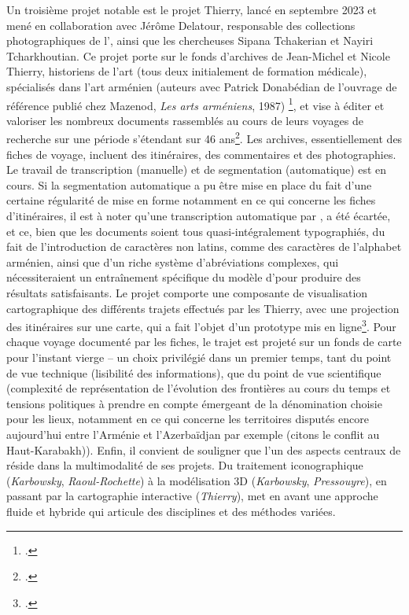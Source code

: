 Un troisième projet notable est le projet Thierry, lancé en septembre 2023 et mené en collaboration avec Jérôme Delatour, responsable des collections photographiques de l'\inha, ainsi que les chercheuses Sipana Tchakerian et Nayiri Tcharkhoutian. Ce projet porte sur le fonds d'archives de Jean-Michel et Nicole Thierry, historiens de l'art (tous deux initialement de formation médicale),  spécialisés dans l'art arménien (auteurs avec Patrick Donabédian de l’ouvrage de référence publié chez Mazenod, \textit{Les arts arméniens}, 1987) \footcite{mouradian_jean-michel_nodate}, et vise à éditer et valoriser les nombreux documents rassemblés au cours de leurs voyages de recherche sur une période s’étendant sur 46 ans\footcite{inha_fonds_nodate}. 
Les archives, essentiellement des fiches de voyage, incluent des itinéraires, des commentaires et des photographies. Le travail de transcription (manuelle) et de segmentation (automatique) est en cours. Si la segmentation automatique a pu être mise en place du fait d’une certaine régularité de mise en forme notamment en ce qui concerne les fiches d’itinéraires, il est à noter qu’une transcription automatique par \ocr, a été écartée, et ce, bien que les documents soient tous quasi-intégralement typographiés, du fait de l’introduction de caractères non latins, comme des caractères de l’alphabet arménien, ainsi que d’un riche système d’abréviations complexes, qui nécessiteraient un entraînement spécifique du modèle d’\ocr pour produire des résultats satisfaisants. Le projet comporte une composante de visualisation cartographique des différents trajets effectués par les Thierry, avec une projection des itinéraires sur une carte, qui a fait l’objet d’un prototype mis en ligne\footcite{inha_fonds_nodate}. 
Pour chaque voyage documenté par les fiches, le trajet est projeté sur un fonds de carte pour l’instant vierge – un choix privilégié dans un premier temps, tant du point de vue technique (lisibilité des informations), que du point de vue scientifique (complexité de représentation de l’évolution des frontières au cours du temps et tensions politiques à prendre en compte émergeant de la dénomination choisie pour les lieux, notamment en ce qui concerne les territoires disputés encore aujourd’hui entre l’Arménie et l’Azerbaïdjan par exemple (citons le conflit au Haut-Karabakh)).
Enfin, il convient de souligner que l’un des aspects centraux de \pense réside dans la multimodalité de ses projets. Du traitement iconographique (\textit{Karbowsky}, \textit{Raoul-Rochette}) à la modélisation 3D (\textit{Karbowsky}, \textit{Pressouyre}), en passant par la cartographie interactive (\textit{Thierry}), \pense met en avant une approche fluide et hybride qui articule des disciplines et des méthodes variées.


